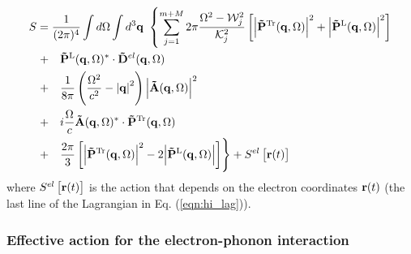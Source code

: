 \begin{equation}
    \begin{aligned}
        S &= \frac{1}{(2\pi)^4} \int d\Omega \int d^3 \vb{q}\ \left\{ \sum_{j=1}^{m+M} 2\pi \frac{\Omega^2 - \mathcal{W}_j^2}{\mathcal{K}_j^2} \left[ \abs{\vb{\Tilde{P}}^{\text{Tr}}(\vb{q}, \Omega)}^2 + \abs{\vb{\Tilde{P}}^{\text{L}}(\vb{q}, \Omega)}^2 \right] \right. \\
        &\left. +\quad \vb{\Tilde{P}}^{\text{L}}(\vb{q}, \Omega)^* \cdot \vb{\Tilde{D}}^{el}(\vb{q}, \Omega) \right. \\
        &\left. +\quad \frac{1}{8\pi} \left( \frac{\Omega^2}{c^2} - \abs{\vb{q}}^2 \right) \abs{\vb{\Tilde{A}}(\vb{q}, \Omega)}^2 \right. \\
        & \left. +\quad i \frac{\Omega}{c} \vb{\Tilde{A}}(\vb{q}, \Omega)^* \cdot \vb{\Tilde{P}}^{\text{Tr}}(\vb{q}, \Omega) \right. \\
        &\left. +\quad  \frac{2\pi}{3} \left[ \abs{\vb{\Tilde{P}}^{\text{Tr}}(\vb{q}, \Omega)}^2 - 2\abs{\vb{\Tilde{P}}^{\text{L}}(\vb{q}, \Omega)} \right] \right\} + S^{el} \left[ \vb{r}(t) \right]
    \end{aligned}
\end{equation}
where $S^{el} \left[ \vb{r}(t) \right]$ is the action that depends on the electron coordinates $\vb{r}(t)$ (the last line of the Lagrangian in Eq. (\ref{eqn:hi_lag})).

\subsubsection{Effective action for the electron-phonon interaction}
\label{subsubsec:2-3-3-3}

